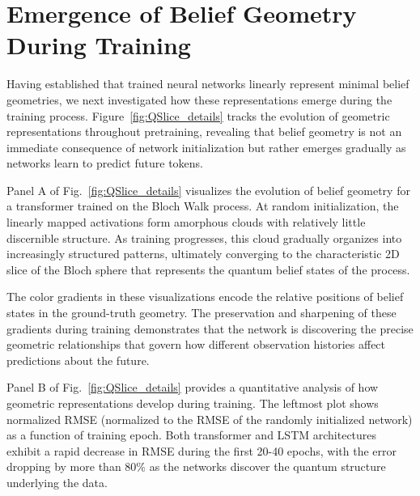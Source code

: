 \documentclass[prx,nofootinbib,onecolumn,showkeys,groupaddress,preprintnumbers,floatfix,
superscriptaddress]{revtex4-1}
\begin{document}



\section{Emergence of Belief Geometry During Training}

Having established that trained neural networks linearly represent minimal belief geometries, we next investigated how these representations emerge during the training process. Figure~\ref{fig:QSlice_details} tracks the evolution of geometric representations throughout pretraining, revealing that belief geometry is not an immediate consequence of network initialization but rather emerges gradually as networks learn to predict future tokens.


Panel A of Fig.~\ref{fig:QSlice_details} visualizes the evolution of belief geometry for a transformer trained on the Bloch Walk process. At random initialization, the linearly mapped activations form amorphous clouds with relatively little discernible structure. As training progresses, this cloud gradually organizes into increasingly structured patterns, ultimately converging to the characteristic 2D slice of the Bloch sphere that represents the quantum belief states of the process.

The color gradients in these visualizations encode the relative positions of belief states in the ground-truth geometry. The preservation and sharpening of these gradients during training demonstrates that the network 
is discovering the precise geometric relationships that govern how different observation histories affect predictions about the future.


Panel B of Fig.~\ref{fig:QSlice_details} provides a quantitative analysis of how geometric representations develop during training. The leftmost plot shows normalized RMSE (normalized to the RMSE of the randomly initialized network) as a function of training epoch. Both transformer and LSTM architectures exhibit a rapid decrease in RMSE during the first 20-40 epochs, with the error dropping by more than 80\% as the networks discover the quantum structure underlying the data.
\end{document}
